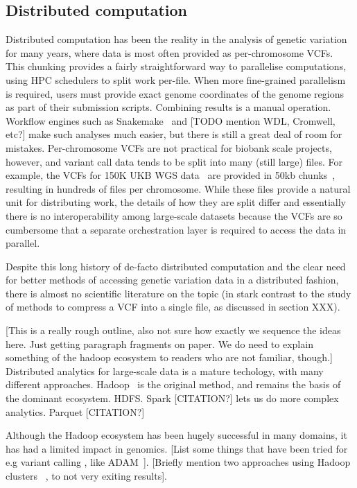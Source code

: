 \documentclass[a4paper,num-refs]{oup-contemporary}
\begin{document}
\subsection{Distributed computation}
Distributed computation has been the reality in the analysis
of genetic variation for many years,
where data is most often provided as per-chromosome VCFs.
This chunking provides a fairly straightforward way to parallelise
computations, using HPC schedulers to split work per-file.
When more fine-grained parallelism is required, users must
provide exact genome coordinates of the genome regions
as part of their submission scripts. Combining results
is a manual operation.
Workflow engines such as
Snakemake~\cite{koster2012snakemake,molder2021sustainable}
and [TODO mention WDL, Cromwell, etc?] make such analyses
much easier, but there is still a great deal of room for
mistakes.
Per-chromosome VCFs are not practical for biobank scale
projects, however, and variant call data tends to be split
into many (still large) files.
For example, the VCFs for 150K UKB WGS data~\cite{halldorsson2022sequences}
are provided in 50kb chunks~\cite{browning2023statistical}, resulting in
hundreds of files per chromosome.
While these files provide a natural
unit for distributing work, the details of how they
are split differ and essentially there is
no interoperability among large-scale datasets because the VCFs are
so cumbersome that a separate orchestration layer is required to
access the data in parallel.

Despite this long history of de-facto distributed computation
and the clear need for better methods of accessing genetic
variation data in a distributed fashion, there is almost
no scientific literature on the topic (in stark contrast to the
study of methods to compress a VCF into a single file,
as discussed in section XXX).

[This is a really rough outline, also not sure how exactly
we sequence the ideas here. Just getting paragraph fragments
on paper. We do need to explain something of the hadoop ecosystem
to readers who are not familiar, though.]
Distributed analytics for large-scale data is a mature
techology, with many different approaches. Hadoop~\citep{white2012hadoop}
is the original method, and remains the basis of the
dominant ecosystem. HDFS. Spark [CITATION?] lets us
do more complex analytics. Parquet [CITATION?]

Although the Hadoop ecosystem has been hugely successful
in many domains, it has had a limited impact in genomics.
[List some things that have been tried for e.g variant calling
, like ADAM~\citep{nothaft2015rethinking}].
[Briefly mention two approaches using Hadoop clusters
~\citep{boufea2017managing,fan2020variant}, to not very
exiting results].
\end{document}

